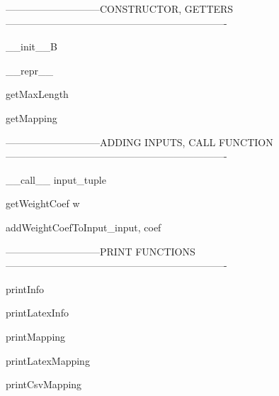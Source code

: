 -----------------------------CONSTRUCTOR, GETTERS-------------------------------------------------------------------

\begin{method}{\_\_init\_\_}{B}

\end{method}


\begin{method}{\_\_repr\_\_}{}

\end{method}


\begin{method}{getMaxLength}{}

\end{method}


\begin{method}{getMapping}{}

\end{method}


-----------------------------ADDING INPUTS, CALL FUNCTION-------------------------------------------------------------------

\begin{method}{\_\_call\_\_}{ input\_tuple}

\end{method}


\begin{method}{getWeightCoef}{ w}

\end{method}


\begin{method}{addWeightCoefToInput}{\_input, coef}

\end{method}


-----------------------------PRINT FUNCTIONS-------------------------------------------------------------------

\begin{method}{printInfo}{}

\end{method}


\begin{method}{printLatexInfo}{}

\end{method}


\begin{method}{printMapping}{}

\end{method}


\begin{method}{printLatexMapping}{}

\end{method}


\begin{method}{printCsvMapping}{}

\end{method}

